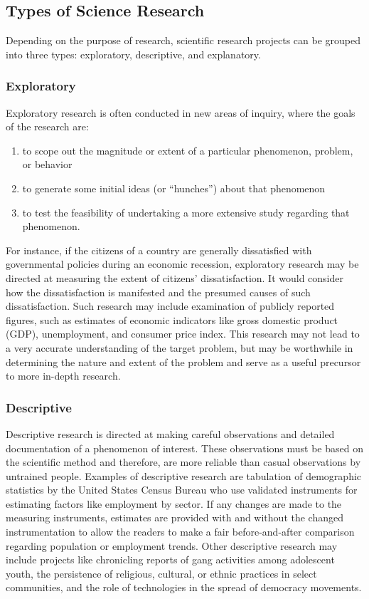 \subsection{Types of Science Research}

Depending on the purpose of research, scientific research projects can be grouped into three types: exploratory, descriptive, and explanatory. 

\subsubsection{Exploratory}

Exploratory research is often conducted in new areas of inquiry, where the goals of the research are: 

\begin{enumerate}
	\item to scope out the magnitude or extent of a particular phenomenon, problem, or behavior
	\item to generate some initial ideas (or ``hunches'') about that phenomenon
	\item to test the feasibility of undertaking a more extensive study regarding that phenomenon. 
\end{enumerate}

For instance, if the citizens of a country are generally dissatisfied with governmental policies during an economic recession, exploratory research may be directed at measuring the extent of citizens' dissatisfaction. It would consider how the dissatisfaction is manifested and the presumed causes of such dissatisfaction. Such research may include examination of publicly reported figures, such as estimates of economic indicators like gross domestic product (GDP), unemployment, and consumer price index. This research may not lead to a very accurate understanding of the target problem, but may be worthwhile in determining the nature and extent of the problem and serve as a useful precursor to more in-depth research.

\subsubsection{Descriptive}

Descriptive research is directed at making careful observations and detailed documentation of a phenomenon of interest. These observations must be based on the scientific method and therefore, are more reliable than casual observations by untrained people. Examples of descriptive research are tabulation of demographic statistics by the United States Census Bureau who use validated instruments for estimating factors like employment by sector. If any changes are made to the measuring instruments, estimates are provided with and without the changed instrumentation to allow the readers to make a fair before-and-after comparison regarding population or employment trends. Other descriptive research may include projects like chronicling reports of gang activities among adolescent youth, the persistence of religious, cultural, or ethnic practices in select communities, and the role of technologies in the spread of democracy movements.

